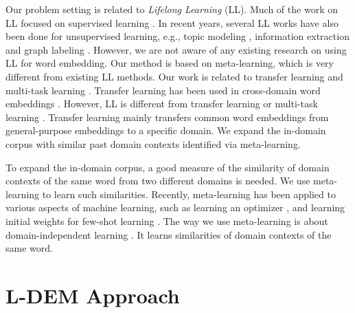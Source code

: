 Our problem setting is related to \textit{Lifelong Learning} (LL). Much of the work on LL focused on supervised learning \cite{Thrun1996learning,Silver2013,ChenLiu2016}.
In recent years, several LL works have also been done for unsupervised learning, e.g., topic modeling \cite{chen2014topic}, information extraction \cite{Mitchell2015} and graph labeling \cite{shu2016lifelong}. 
However, we are not aware of any existing research on using LL for word embedding. Our method is based on meta-learning, which is very different from existing LL methods.
Our work is related to transfer learning and multi-task learning \cite{pan2010survey}. Transfer learning has been used in cross-domain word embeddings \cite{bollegala-maehara-kawarabayashi:2015:ACL-IJCNLP,yang-lu-zheng:2017:EMNLP2017}. However, LL is different from transfer learning or multi-task learning \cite{ChenLiu2016}. 
Transfer learning mainly transfers common word embeddings from general-purpose embeddings to a specific domain. We expand the in-domain corpus with similar past domain contexts identified via meta-learning. 

To expand the in-domain corpus, a good measure of the similarity of domain contexts of the same word from two different domains is needed.
We use meta-learning \cite{thrun2012learning} to learn such similarities.
Recently, meta-learning has been applied to various aspects of machine learning, 
such as learning an optimizer \cite{andrychowicz2016learning},
and learning initial weights for few-shot learning \cite{finn2017model}.
The way we use meta-learning is about domain-independent learning \cite{JMLR:v17:15-239}. It learns similarities of domain contexts of the same word.

\section{L-DEM Approach}
\label{chap3:sec:ldem}

